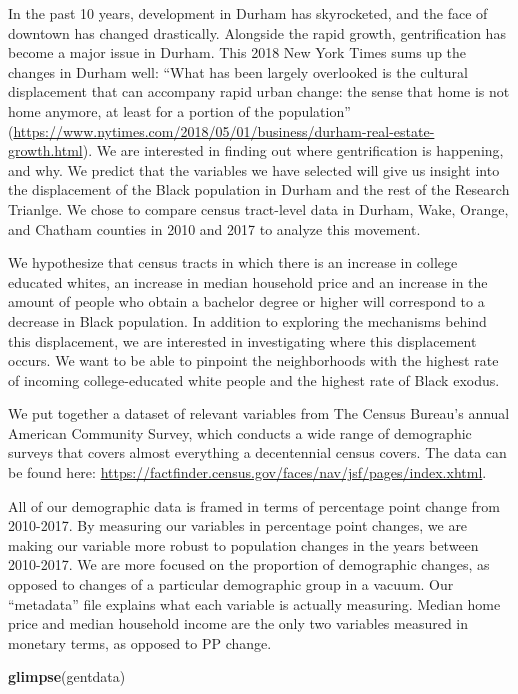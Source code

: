 \documentclass[]{article}
\newenvironment{Shaded}{\begin{snugshade}}{\end{snugshade}}
\newcommand{\KeywordTok}[1]{\textcolor[rgb]{0.13,0.29,0.53}{\textbf{#1}}}
\newcommand{\NormalTok}[1]{#1}
\begin{document}
In the past 10 years, development in Durham has skyrocketed, and the
face of downtown has changed drastically. Alongside the rapid growth,
gentrification has become a major issue in Durham. This 2018 New York
Times sums up the changes in Durham well: ``What has been largely
overlooked is the cultural displacement that can accompany rapid urban
change: the sense that home is not home anymore, at least for a portion
of the population''
(\url{https://www.nytimes.com/2018/05/01/business/durham-real-estate-growth.html}).
We are interested in finding out where gentrification is happening, and
why. We predict that the variables we have selected will give us insight
into the displacement of the Black population in Durham and the rest of
the Research Trianlge. We chose to compare census tract-level data in
Durham, Wake, Orange, and Chatham counties in 2010 and 2017 to analyze
this movement.

We hypothesize that census tracts in which there is an increase in
college educated whites, an increase in median household price and an
increase in the amount of people who obtain a bachelor degree or higher
will correspond to a decrease in Black population. In addition to
exploring the mechanisms behind this displacement, we are interested in
investigating where this displacement occurs. We want to be able to
pinpoint the neighborhoods with the highest rate of incoming
college-educated white people and the highest rate of Black exodus.

We put together a dataset of relevant variables from The Census Bureau's
annual American Community Survey, which conducts a wide range of
demographic surveys that covers almost everything a decentennial census
covers. The data can be found here:
\url{https://factfinder.census.gov/faces/nav/jsf/pages/index.xhtml}.

All of our demographic data is framed in terms of percentage point
change from 2010-2017. By measuring our variables in percentage point
changes, we are making our variable more robust to population changes in
the years between 2010-2017. We are more focused on the proportion of
demographic changes, as opposed to changes of a particular demographic
group in a vacuum. Our ``metadata'' file explains what each variable is
actually measuring. Median home price and median household income are
the only two variables measured in monetary terms, as opposed to PP
change.

\begin{Shaded}
\begin{Highlighting}[]
\KeywordTok{glimpse}\NormalTok{(gentdata)}
\end{Highlighting}
\end{Shaded}
\end{document}
